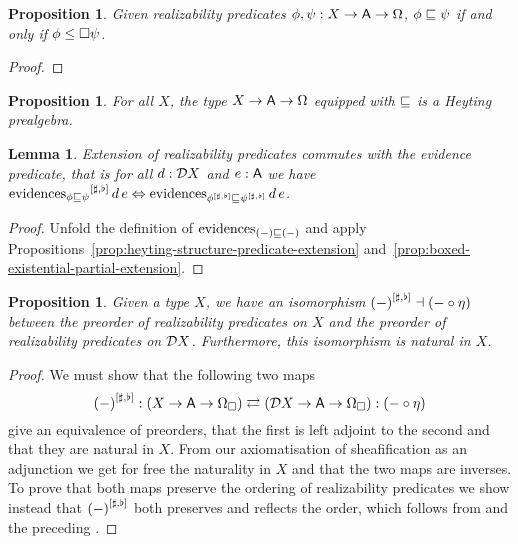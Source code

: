 \documentclass[11pt]{article}
\newtheorem{lemm}[thrm]{Lemma}
\newtheorem{prop}[thrm]{Proposition}
\begin{document}
\begin{prop}
  Given realizability predicates \(\phi, \psi : {{X}\to{{{\ensuremath{\mathsf{A}}}\to{\Omega}}}}\),
  \({\phi}\sqsubseteq{\psi}\) if and only if \({\phi}\leq{\Box{\psi}}\).
\end{prop}
\begin{proof}
\end{proof}

\begin{prop}
  For all \(X\), the type \({{X}\to{{{\ensuremath{\mathsf{A}}}\to{\Omega}}}}\) equipped with
  \(\sqsubseteq\) is a Heyting prealgebra.
\end{prop}

\begin{lemm}\label{prop:vo-extension-of-evidence-predicate}
  Extension of realizability predicates commutes with the evidence
  predicate, that is for all \(d:\mathcal{D}{X}\) and \(e:\mathsf{A}\) we have
  \(
    {\text{evidences}_{{\phi}\sqsubseteq{\psi}}}^{[{\sharp,\flat}]}\,d\,e
    \Leftrightarrow
    \text{evidences}_{{{\phi}^{[{\sharp,\flat}]}}\sqsubseteq{{\psi}^{[{\sharp,\flat}]}}}\,d\,e
  \).
\end{lemm}
\begin{proof}
  Unfold the definition of \(\text{evidences}_{{(-)}\sqsubseteq{(-)}}\) and apply
  Propositions~\ref{prop:heyting-structure-predicate-extension}
  and~\ref{prop:boxed-existential-partial-extension}.
\end{proof}

\begin{prop}
  Given a type \(X\), we have an isomorphism
  \({(-)}^{[{\sharp,\flat}]} \dashv (-\circ\eta)\)
  between the preorder of realizability predicates on \(X\)
  and the preorder of realizability predicates on \(\mathcal{D}{X}\).
  Furthermore, this isomorphism is natural in \(X\).
\end{prop}
\begin{proof}
  We must show that the following two maps
  \[
    {(-)}^{[{\sharp,\flat}]} : {({{X}\to{{{\ensuremath{\mathsf{A}}}\to{\Omega_\Box}}}})} \rightleftarrows {({{\mathcal{D}{X}}\to{{{\ensuremath{\mathsf{A}}}\to{\Omega_\Box}}}})} : (-\circ\eta)
  \]
  give an equivalence of preorders, that the first is left adjoint to the
  second and that they are natural in \(X\).
  From our axiomatisation of sheafification as an adjunction we get
  for free the naturality in \(X\) and that the two maps are inverses.
  To prove that both maps preserve the ordering of realizability predicates
  we show instead that \({(-)}^{[{\sharp,\flat}]}\) both preserves and reflects the order,
  which follows from  and
  the preceding .
\end{proof}


\newpage
\end{document}
